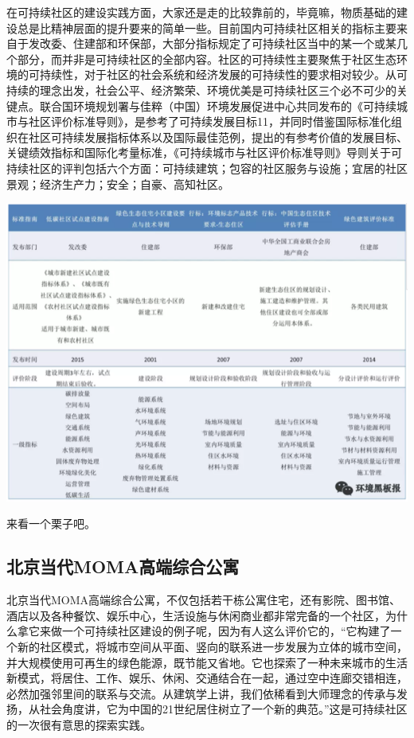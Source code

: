 \documentclass[]{book}
\begin{document}
在可持续社区的建设实践方面，大家还是走的比较靠前的，毕竟嘛，物质基础的建设总是比精神层面的提升要来的简单一些。目前国内可持续社区相关的指标主要来自于发改委、住建部和环保部，大部分指标规定了可持续社区当中的某一个或某几个部分，而并非是可持续社区的全部内容。社区的可持续性主要聚焦于社区生态环境的可持续性，对于社区的社会系统和经济发展的可持续性的要求相对较少。从可持续的理念出发，社会公平、经济繁荣、环境优美是可持续社区三个必不可少的关键点。联合国环境规划署与佳粹（中国）环境发展促进中心共同发布的《可持续城市与社区评价标准导则》，是参考了可持续发展目标11，并同时借鉴国际标准化组织在社区可持续发展指标体系以及国际最佳范例，提出的有参考价值的发展目标、关键绩效指标和国际化考量标准，《可持续城市与社区评价标准导则》导则关于可持续社区的评判包括六个方面：可持续建筑；包容的社区服务与设施；宜居的社区景观；经济生产力；安全；自豪、高知社区。

\includegraphics[width=8.33in]{images/moma4}

来看一个栗子吧。

\subsection{北京当代MOMA高端综合公寓}\label{moma}

北京当代MOMA高端综合公寓，不仅包括若干栋公寓住宅，还有影院、图书馆、酒店以及各种餐饮、娱乐中心，生活设施与休闲商业都非常完备的一个社区，为什么拿它来做一个可持续社区建设的例子呢，因为有人这么评价它的，``它构建了一个新的社区模式，将城市空间从平面、竖向的联系进一步发展为立体的城市空间，并大规模使用可再生的绿色能源，既节能又省地。它也探索了一种未来城市的生活新模式，将居住、工作、娱乐、休闲、交通结合在一起，通过空中连廊交错相连，必然加强邻里间的联系与交流。从建筑学上讲，我们依稀看到大师理念的传承与发扬，从社会角度讲，它为中国的21世纪居住树立了一个新的典范。''这是可持续社区的一次很有意思的探索实践。
\end{document}

